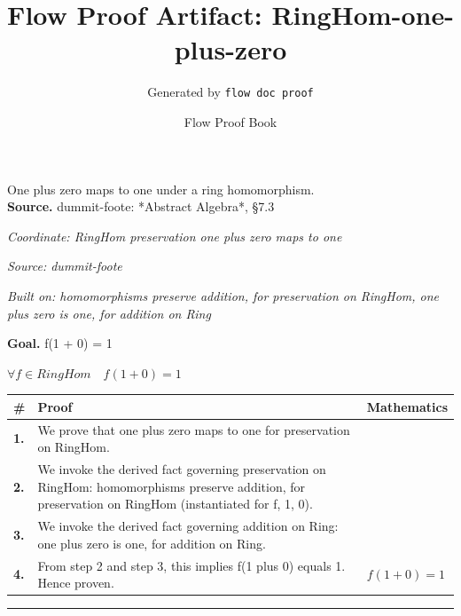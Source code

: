 \documentclass[11pt]{article}
\title{Flow Proof Artifact: RingHom-one-plus-zero}
\author{Generated by \texttt{flow doc proof}}
\date{Flow Proof Book}
\theoremstyle{definition}
\begin{document}
\maketitle
One plus zero maps to one under a ring homomorphism.\\[0.5em]
\textbf{Source.} dummit-foote: *Abstract Algebra*, §7.3\\[0.5em]
\bigskip
{}\par
\smallskip\noindent\textit{Coordinate: RingHom \cdot preservation \cdot one plus zero maps to one}\par
\smallskip\noindent\textit{Source: dummit-foote}\par
\smallskip\noindent\textit{Built on: homomorphisms preserve addition, for preservation on RingHom, one plus zero is one, for addition on Ring}\par
\medskip
\noindent\textbf{Goal.} f(1 + 0) = 1\par
\noindent$\displaystyle \forall f \in RingHom\quad f(1 + 0) = 1$\par
\medskip
\noindent
\begin{tabular}{@{} >{\raggedright\arraybackslash}p{} >{\raggedright\arraybackslash}p{} >{\raggedleft\arraybackslash}p{} @{}}
\textbf{\#} & \textbf{Proof} & \textbf{Mathematics} \\
\midrule
\textbf{1.} & We prove that one plus zero maps to one for preservation on RingHom. & \\[0.45em]
\textbf{2.} & We invoke the derived fact governing preservation on RingHom: homomorphisms preserve addition, for preservation on RingHom (instantiated for f, 1, 0). & \\[0.45em]
\textbf{3.} & We invoke the derived fact governing addition on Ring: one plus zero is one, for addition on Ring. & \\[0.45em]
\textbf{4.} & From step 2 and step 3, this implies f(1 plus 0) equals 1. Hence proven. & $\displaystyle f(1 + 0) = 1$ \\[0.45em]
\bottomrule
\end{tabular}
\label{thm:RingHom-preservation-one_plus_zero_maps_to_one}
\par\medskip\hrule
\end{document}
